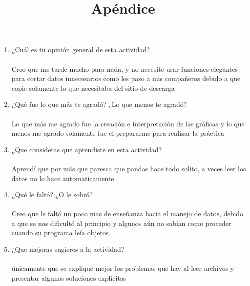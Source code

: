 \documentclass{article}
\begin{document}
\newpage

\title{Apéndice}

\begin{enumerate}
\item ¿Cuál es tu opinión general de esta actividad? ~\\~\\
Creo que me tarde mucho para nada, y no necesite usar funciones elegantes para cortar datos innecesarios como les paso a mis compañeros debido a que copie solamente lo que necesitaba del sitio de descarga

\item ¿Qué fue lo que más te agradó? ¿Lo que menos te agradó?~\\~\\
Lo que más me agrado fue la creación e interpretación de las gráficas y lo que menos me agrado solamente fue el prepararme para realizar la práctica

\item ¿Que consideras que aprendiste en esta actividad?  ~\\~\\
Aprendí que por más que paresca que pandas hace todo solito, a veces leer los datos no lo hace automaticamente

\item ¿Qué le faltó? ¿O le sobró?   ~\\~\\
Creo que le faltó un poco mas de enseñanza hacia el manejo de datos, debido a que se nos dificultó al principio y algunos aún no sabían como proceder cuando su programa leía objetos.

\item ¿Que mejoras sugieres a la actividad? ~\\~\\
únicamente que se explique mejor los problemas que hay al leer archivos y presentar algunas soluciones explícitas

\end{enumerate}
\end{document}
